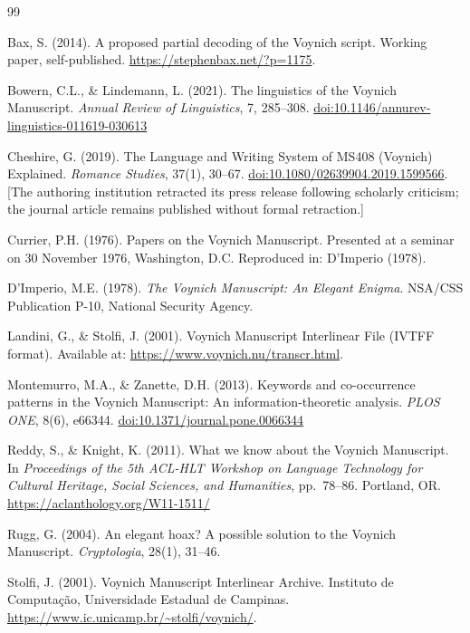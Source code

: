 \documentclass[11pt,a4paper,twocolumn]{article}
\begin{document}
\begin{thebibliography}{99}
\small

 Bax, S. (2014). A proposed partial decoding of the Voynich script. Working paper, self-published. \url{https://stephenbax.net/?p=1175}.

 Bowern, C.L., \& Lindemann, L. (2021). The linguistics of the Voynich Manuscript. \textit{Annual Review of Linguistics}, 7, 285--308. \href{https://doi.org/10.1146/annurev-linguistics-011619-030613}{doi:10.1146/annurev-linguistics-011619-030613}

 Cheshire, G. (2019). The Language and Writing System of MS408 (Voynich) Explained. \textit{Romance Studies}, 37(1), 30--67. \href{https://doi.org/10.1080/02639904.2019.1599566}{doi:10.1080/02639904.2019.1599566}. [The authoring institution retracted its press release following scholarly criticism; the journal article remains published without formal retraction.]

 Currier, P.H. (1976). Papers on the Voynich Manuscript. Presented at a seminar on 30 November 1976, Washington, D.C. Reproduced in: D'Imperio (1978).

 D'Imperio, M.E. (1978). \textit{The Voynich Manuscript: An Elegant Enigma}. NSA/CSS Publication P-10, National Security Agency.

 Landini, G., \& Stolfi, J. (2001). Voynich Manuscript Interlinear File (IVTFF format). Available at: \url{https://www.voynich.nu/transcr.html}.

 Montemurro, M.A., \& Zanette, D.H. (2013). Keywords and co-occurrence patterns in the Voynich Manuscript: An information-theoretic analysis. \textit{PLOS ONE}, 8(6), e66344. \href{https://doi.org/10.1371/journal.pone.0066344}{doi:10.1371/journal.pone.0066344}

 Reddy, S., \& Knight, K. (2011). What we know about the Voynich Manuscript. In \textit{Proceedings of the 5th ACL-HLT Workshop on Language Technology for Cultural Heritage, Social Sciences, and Humanities}, pp.\ 78--86. Portland, OR. \url{https://aclanthology.org/W11-1511/}

 Rugg, G. (2004). An elegant hoax? A possible solution to the Voynich Manuscript. \textit{Cryptologia}, 28(1), 31--46.

 Stolfi, J. (2001). Voynich Manuscript Interlinear Archive. Instituto de Computa\c{c}\~{a}o, Universidade Estadual de Campinas. \url{https://www.ic.unicamp.br/~stolfi/voynich/}.


\end{thebibliography}
\end{document}
